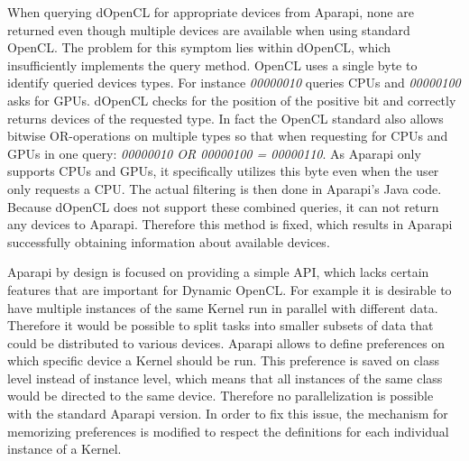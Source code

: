 \begin{description}[style=nextline]
	\item [No available devices]
	When querying dOpenCL for appropriate devices from Aparapi, none are returned even though multiple devices are available when using standard OpenCL. The problem for this symptom lies within dOpenCL, which insufficiently implements the query method. OpenCL uses a single byte to identify queried devices types. For instance \textit{00000010} queries CPUs and \textit{00000100} asks for GPUs. dOpenCL checks for the position of the positive bit and correctly returns devices of the requested type. In fact the OpenCL standard also allows bitwise OR-operations on multiple types so that when requesting for CPUs and GPUs in one query: \textit{00000010 OR 00000100 = 00000110}. As Aparapi only supports CPUs and GPUs, it specifically utilizes this byte even when the user only requests a CPU. The actual filtering is then done in Aparapi's Java code. Because dOpenCL does not support these combined queries, it can not return any devices to Aparapi. Therefore this method is fixed, which results in Aparapi successfully obtaining information about available devices.
	
	\item [Specific device choice]
	Aparapi by design is focused on providing a simple API, which lacks certain features that are important for Dynamic OpenCL. For example it is desirable to have multiple instances of the same Kernel run in parallel with different data. Therefore it would be possible to split tasks into smaller subsets of data that could be distributed to various devices. Aparapi allows to define preferences on which specific device a Kernel should be run. This preference is saved on class level instead of instance level, which means that all instances of the same class would be directed to the same device. Therefore no parallelization is possible with the standard Aparapi version. In order to fix this issue, the mechanism for memorizing preferences is modified to respect the definitions for each individual instance of a Kernel.
	

\end{description}
